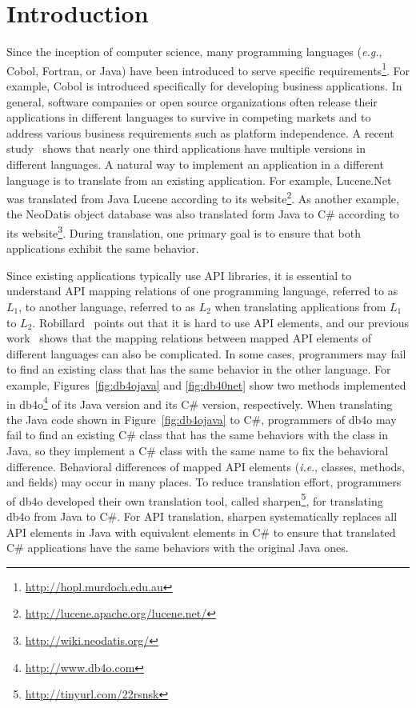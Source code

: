 \section{Introduction}
\label{sec:introduction}

Since the inception of computer science, many programming languages (\emph{e.g.}, Cobol, Fortran, or Java) have been introduced to serve specific requirements\footnote{\url{http://hopl.murdoch.edu.au}}. For example, Cobol is introduced specifically for developing business applications. In general, software companies or open source organizations often release their applications in different languages to survive in competing markets and to address various business requirements such as platform independence. A recent study~\cite{jones1998estimating} shows that nearly one third applications have multiple versions in different languages. A natural way to implement an application in a different language is to translate from an existing application. For example, Lucene.Net was translated from Java Lucene according to its website\footnote{\url{http://lucene.apache.org/lucene.net/}}. As another example, the NeoDatis object database was also translated form Java to C\# according to its website\footnote{\url{http://wiki.neodatis.org/}}. During translation, one primary goal is to ensure that both applications exhibit the same behavior.

Since existing applications typically use API libraries, it is essential to understand API mapping relations of one programming language, referred to as $L_1$, to another language, referred to as $L_2$ when translating applications from $L_1$ to $L_2$. Robillard~\cite{robillard2009makes} points out that it is hard to use API elements, and our previous work~\cite{zhong2010mining} shows that the mapping relations between mapped API elements of different languages can also be complicated. In some cases, programmers may fail to find an existing class that has the same behavior in the other language. For example, Figures~\ref{fig:db4ojava} and \ref{fig:db40net} show two methods implemented in db4o\footnote{\url{http://www.db4o.com}} of its Java version and its C\# version, respectively. When translating the Java code shown in Figure~\ref{fig:db4ojava} to C\#, programmers of db4o may fail to find an existing C\# class that has the same behaviors with the  class in Java, so they implement a C\# class with the same name to fix the behavioral difference. Behavioral differences of mapped API elements (\emph{i.e}., classes, methods, and fields) may occur in many places. To reduce translation effort, programmers of db4o developed their own translation tool, called sharpen\footnote{\url{http://tinyurl.com/22rsnsk}}, for translating db4o from Java to C\#. For API translation, sharpen systematically replaces all API elements in Java with equivalent elements in C\# to ensure that translated C\# applications have the same behaviors with the original Java ones.

